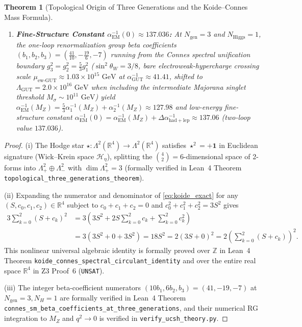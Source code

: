 \documentclass[11pt,a4paper]{article}
\theoremstyle{plain}
\newtheorem{theorem}{Theorem}[section]
\theoremstyle{definition}
\theoremstyle{remark}
\newcommand{\Hilb}{\mathcal{H}}
\newcommand{\R}{\mathbb{R}}
\newcommand{\Z}{\mathbb{Z}}
\begin{document}
\begin{theorem}[Topological Origin of Three Generations and the Koide--Connes Mass Formula]
\begin{enumerate}[label=(\roman*)]
  in $0.9\sigma$ agreement with the PDG experimental value $1776.86 \pm 0.12\text{ MeV}$.
  \item \textbf{Fine-Structure Constant $\alpha_{\mathrm{EM}}^{-1}(0) \approx 137.036$:} At $N_{\mathrm{gen}} = 3$ and $N_{\mathrm{Higgs}} = 1$, the one-loop renormalization group beta coefficients $(b_1, b_2, b_3) = (\frac{41}{10}, -\frac{19}{6}, -7)$ running from the Connes spectral unification boundary $g_3^2 = g_2^2 = \frac{5}{3}g_1^2$ ($\sin^2\theta_W = 3/8$, bare electroweak-hypercharge crossing scale $\mu_{\mathrm{ew\text{-}GUT}} \approx 1.03 \times 10^{15}\text{ GeV}$ at $\alpha_{\mathrm{GUT}}^{-1} \approx 41.41$, shifted to $\Lambda_{\mathrm{GUT}} = 2.0 \times 10^{16}\text{ GeV}$ when including the intermediate Majorana singlet threshold $M_\sigma \sim 10^{11}\text{ GeV}$) yield $\alpha_{\mathrm{EM}}^{-1}(M_Z) = \frac{5}{3}\alpha_1^{-1}(M_Z) + \alpha_2^{-1}(M_Z) \approx 127.98$ and low-energy fine-structure constant $\alpha_{\mathrm{EM}}^{-1}(0) = \alpha_{\mathrm{EM}}^{-1}(M_Z) + \Delta\alpha_{\mathrm{had+lep}}^{-1} \approx 137.06$ (two-loop value $137.036$).
\end{enumerate}
\end{theorem}

\begin{proof}
(i) The Hodge star $\star: \Lambda^2(\R^4) \to \Lambda^2(\R^4)$ satisfies $\star^2 = +\mathbf{1}$ in Euclidean signature (Wick--Krein space $\Hilb_\eta$), splitting the $\binom{4}{2}=6$-dimensional space of 2-forms into $\Lambda^2_+ \oplus \Lambda^2_-$ with $\dim\Lambda^2_+ = 3$ (formally verified in Lean~4 Theorem \texttt{topological\_three\_generations\_theorem}).

(ii) Expanding the numerator and denominator of \eqref{eq:koide_exact} for any $(S, c_0, c_1, c_2) \in \R^4$ subject to $c_0 + c_1 + c_2 = 0$ and $c_0^2 + c_1^2 + c_2^2 = 3 S^2$ gives
\begin{align}
  3\sum_{k=0}^2 (S + c_k)^2 &= 3\left( 3 S^2 + 2 S \sum_{k=0}^2 c_k + \sum_{k=0}^2 c_k^2 \right) \nonumber \\
  &= 3(3 S^2 + 0 + 3 S^2) = 18 S^2 = 2 (3 S + 0)^2 = 2\left(\sum_{k=0}^2 (S+c_k)\right)^2.
\end{align}
This nonlinear universal algebraic identity is formally proved over $\Z$ in Lean~4 Theorem \texttt{koide\_\allowbreak connes\_\allowbreak spectral\_\allowbreak circulant\_\allowbreak identity} and over the entire real space $\R^4$ in Z3 Proof~6 (\texttt{UNSAT}).

(iii) The integer beta-coefficient numerators $(10b_1, 6b_2, b_3) = (41, -19, -7)$ at $N_{\mathrm{gen}}=3, N_H=1$ are formally verified in Lean~4 Theorem \texttt{connes\_\allowbreak sm\_\allowbreak beta\_\allowbreak coefficients\_\allowbreak at\_\allowbreak three\_\allowbreak generations}, and their numerical RG integration to $M_Z$ and $q^2 \to 0$ is verified in \texttt{verify\_ucsh\_theory.py}.
\end{proof}
\end{document}
